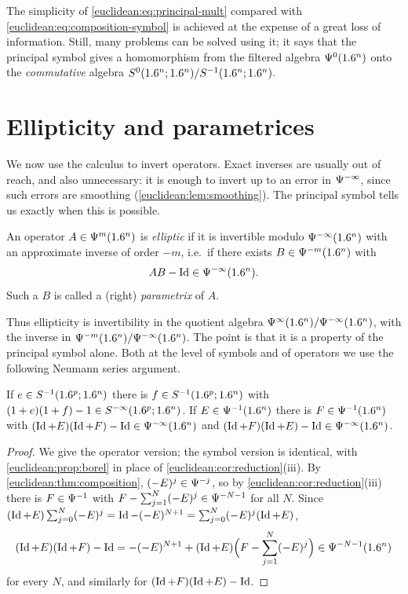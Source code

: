 The simplicity of \eqref{euclidean:eq:principal-mult} compared with
\eqref{euclidean:eq:composition-symbol} is achieved at the expense of a great
loss of information. Still, many problems can be solved using it; it says
that the principal symbol gives a homomorphism from the filtered algebra
$\Psi^{0}(1.6^n)$ onto the \emph{commutative} algebra
$S^0(1.6^n;1.6^n)/S^{-1}(1.6^n;1.6^n)$.

\section{Ellipticity and parametrices}\label{euclidean:sec:ellipticity}

We now use the calculus to invert operators. Exact inverses are usually out of reach,
and also unnecessary: it is enough to invert up to an error in $\Psi^{-\infty}$, since
such errors are smoothing (\cref{euclidean:lem:smoothing}). The principal symbol tells us
exactly when this is possible.

\begin{definition}\label{euclidean:def:elliptic}
  An operator $A\in\Psi^{m}(1.6^n)$ is \emph{elliptic} if it is invertible
  modulo $\Psi^{-\infty}(1.6^n)$ with an approximate inverse of order $-m$,
  i.e.\ if there exists $B\in\Psi^{-m}(1.6^n)$ with
  \begin{equation}\label{euclidean:eq:right-parametrix}
    AB-\operatorname{Id}\in\Psi^{-\infty}(1.6^n).
  \end{equation}
  Such a $B$ is called a (right) \emph{parametrix} of $A$.
\end{definition}

Thus ellipticity is invertibility in the quotient algebra
$\Psi^{\infty}(1.6^n)/\Psi^{-\infty}(1.6^n)$, with the inverse in
$\Psi^{-m}(1.6^n)/\Psi^{-\infty}(1.6^n)$. The point is that it is a property
of the principal symbol alone. Both at the level of symbols and of operators
we use the following Neumann series argument.

\begin{lemma}\label{euclidean:lem:neumann}
  If $e\in S^{-1}(1.6^p;1.6^n)$ there is $f\in S^{-1}(1.6^p;1.6^n)$ with
  $(1+e)(1+f)-1\in S^{-\infty}(1.6^p;1.6^n)$. If $E\in\Psi^{-1}(1.6^n)$ there is
  $F\in\Psi^{-1}(1.6^n)$ with
  $(\operatorname{Id}+E)(\operatorname{Id}+F)-\operatorname{Id}\in\Psi^{-\infty}(1.6^n)$ and
  $(\operatorname{Id}+F)(\operatorname{Id}+E)-\operatorname{Id}\in\Psi^{-\infty}(1.6^n)$.
\end{lemma}
\begin{proof}
  We give the operator version; the symbol version is identical, with
  \cref{euclidean:prop:borel} in place of \cref{euclidean:cor:reduction}(iii).
  By \cref{euclidean:thm:composition}, $(-E)^j\in\Psi^{-j}$, so by
  \cref{euclidean:cor:reduction}(iii) there is $F\in\Psi^{-1}$ with
  $F-\sum_{j=1}^N(-E)^j\in\Psi^{-N-1}$ for all $N$. Since
  $(\operatorname{Id}+E)\sum_{j=0}^N(-E)^j=\operatorname{Id}-(-E)^{N+1}=\sum_{j=0}^N(-E)^j(\operatorname{Id}+E)$,
  \begin{equation*}
    (\operatorname{Id}+E)(\operatorname{Id}+F)-\operatorname{Id}=-(-E)^{N+1}+(\operatorname{Id}+E)\Bigl(F-\sum_{j=1}^N(-E)^j\Bigr)
    \in\Psi^{-N-1}(1.6^n)
  \end{equation*}
  for every $N$, and similarly for $(\operatorname{Id}+F)(\operatorname{Id}+E)-\operatorname{Id}$.
\end{proof}

